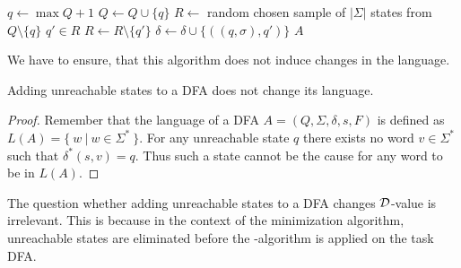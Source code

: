 \vspace{0.2cm}
\begin{algorithmic}[1]
		\State $q \gets \max Q + 1$
		\State $Q \gets Q \cup \{ q \}$
		\State $R \gets$ random chosen sample of $|\Sigma|$ states from $Q \setminus \{q\}$
			\State $q' \in R$
			\State $R \gets R \setminus \{q'\}$
			\State $\delta \gets \delta \cup \{ ((q, \sigma), q') \}$
		\EndFor
	\EndFor
	\State \Return $A$
	\EndFunction
\end{algorithmic}
\vspace{0.2cm}

\noindent We have to ensure, that this algorithm does not induce changes in the language.
\begin{lemma}
	Adding unreachable states to a DFA does not change its language.
\end{lemma}
\begin{proof}
	Remember that the language of a DFA $A = (Q, \Sigma, \delta, s, F)$ is defined as $L(A) = \{\ w\ |\ w \in \Sigma^* \ \}$. For any unreachable state $q$ there exists no word $v \in \Sigma^*$ such that $\delta^*(s,v) = q$. Thus such a state cannot be the cause for any word to be in $L(A)$.
\end{proof}

\noindent The question whether adding unreachable states to a DFA changes $\mathcal{D}$-value is irrelevant. This is because in the context of the minimization algorithm, unreachable states are eliminated before the \MinMark-algorithm is applied on the task DFA.
